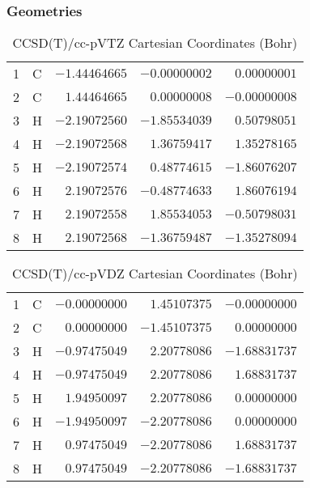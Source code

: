 \documentclass[10pt,oneside]{article}
\begin{document}
\subsubsection*{Geometries}
\begin{table}[h!]
\centering
\caption{CCSD(T)/cc-pVTZ Cartesian Coordinates (Bohr)}
\begin{tabular}{llrrr}
1  & C  & $-1.44464665$ & $-0.00000002$ & $ 0.00000001$ \\
2  & C  & $ 1.44464665$ & $ 0.00000008$ & $-0.00000008$ \\
3  & H  & $-2.19072560$ & $-1.85534039$ & $ 0.50798051$ \\
4  & H  & $-2.19072568$ & $ 1.36759417$ & $ 1.35278165$ \\
5  & H  & $-2.19072574$ & $ 0.48774615$ & $-1.86076207$ \\
6  & H  & $ 2.19072576$ & $-0.48774633$ & $ 1.86076194$ \\
7  & H  & $ 2.19072558$ & $ 1.85534053$ & $-0.50798031$ \\
8  & H  & $ 2.19072568$ & $-1.36759487$ & $-1.35278094$ \\
\end{tabular}
\end{table}

\begin{table}[h!]
\centering
\caption{CCSD(T)/cc-pVDZ Cartesian Coordinates (Bohr)}
\begin{tabular}{llrrr}
1  & C  & $-0.00000000$ & $ 1.45107375$ & $-0.00000000$ \\
2  & C  & $ 0.00000000$ & $-1.45107375$ & $ 0.00000000$ \\
3  & H  & $-0.97475049$ & $ 2.20778086$ & $-1.68831737$ \\
4  & H  & $-0.97475049$ & $ 2.20778086$ & $ 1.68831737$ \\
5  & H  & $ 1.94950097$ & $ 2.20778086$ & $ 0.00000000$ \\
6  & H  & $-1.94950097$ & $-2.20778086$ & $ 0.00000000$ \\
7  & H  & $ 0.97475049$ & $-2.20778086$ & $ 1.68831737$ \\
8  & H  & $ 0.97475049$ & $-2.20778086$ & $-1.68831737$ \\
\end{tabular}
\end{table}
\end{document}
